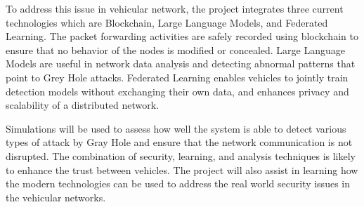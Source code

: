 \documentclass[12pt, a4paper]{report}
\newcommand{\mypar}{\vspace{0.8em}\noindent}
\begin{document}
\mypar
To address this issue in vehicular network, the project integrates three current technologies which are Blockchain, Large Language Models, and Federated Learning. The packet forwarding activities are safely recorded using blockchain to ensure that no behavior of the nodes is modified or concealed. Large Language Models are useful in network data analysis and detecting abnormal patterns that point to Grey Hole attacks. Federated Learning enables vehicles to jointly train detection models without exchanging their own data, and enhances privacy and scalability of a distributed network.

\mypar
Simulations will be used to assess how well the system is able to detect various types of attack by Gray Hole and ensure that the network communication is not disrupted. The combination of security, learning, and analysis techniques is likely to enhance the trust between vehicles. The project will also assist in learning how the modern technologies can be used to address the real world security issues in the vehicular networks.


\renewcommand{\bibname}{References}

 
\end{document}
